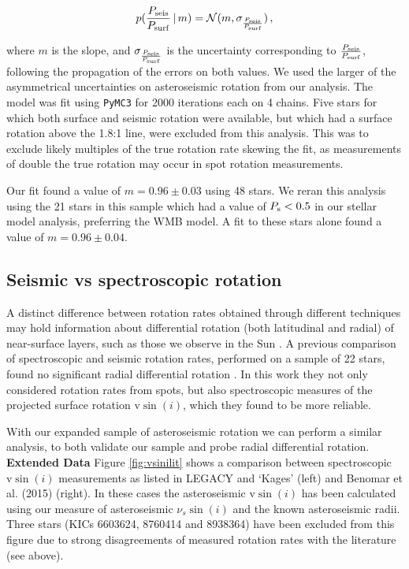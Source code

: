 \begin{equation}
	p(\frac{P_{\rm seis}}{P_{\rm surf}}\, |\, m) = \mathcal{N}(m, \sigma_\frac{P_{\rm seis}}{P_{\rm surf}})\, ,
\end{equation}

\noindent where $m$ is the slope, and $\sigma_\frac{P_{\rm seis}}{P_{\rm surf}}$ is the uncertainty corresponding to $\frac{P_{\rm seis}}{P_{\rm surf}}$, following the propagation of the errors on both values. We used the larger of the asymmetrical uncertainties on asteroseismic rotation from our analysis. The model was fit using \texttt{PyMC3} for 2000 iterations each on 4 chains. Five stars for which both surface and seismic rotation were available, but which had a surface rotation above the 1.8:1 line, were excluded from this analysis. This was to exclude likely multiples of the true rotation rate skewing the fit, as measurements of double the true rotation may occur in spot rotation measurements.

Our fit found a value of $m = 0.96 \pm 0.03$ using 48 stars. We reran this analysis using the 21 stars in this sample which had a value of $P_{\rm s} < 0.5$ in our stellar model analysis, preferring the WMB model. A fit to these stars alone found a value of $m = 0.96 \pm 0.04$.

\subsection{Seismic vs spectroscopic rotation}
A distinct difference between rotation rates obtained through different techniques may hold information about differential rotation (both latitudinal and radial) of near-surface layers, such as those we observe in the Sun \cite{m_beck2000}.  A previous comparison of spectroscopic and seismic rotation rates, performed on a sample of 22 stars, found no significant radial differential rotation \cite{m_benomar+2018}. In this work they not only considered rotation rates from spots, but also spectroscopic measures of the projected surface rotation $\textrm{v}\sin(i)$, which they found to be more reliable.

With our expanded sample of asteroseismic rotation we can perform a similar analysis, to both validate our sample and probe radial differential rotation.  \textbf{Extended Data} Figure \ref{fig:vsinilit} shows a comparison between spectroscopic $\textrm{v}\sin(i)$ measurements as listed in LEGACY and `Kages' (left) and Benomar et al. (2015) \cite{m_benomar+2015} (right). In these cases the asteroseismic $\textrm{v}\sin(i)$ has been calculated using our measure of asteroseismic $\nu_s\sin(i)$ and the known asteroseismic radii. Three stars (KICs 6603624, 8760414 and 8938364) have been excluded from this figure due to strong disagreements of measured rotation rates with the literature (see above).


